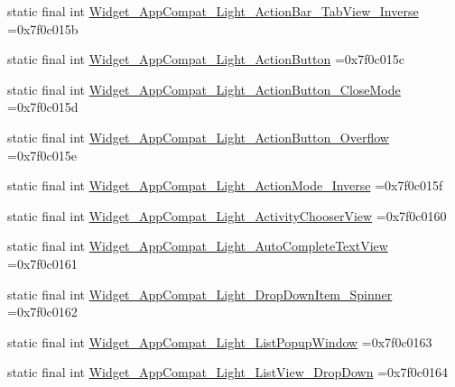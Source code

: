 \begin{DoxyCompactItemize}
\item 
static final int \mbox{\hyperlink{classbr_1_1unb_1_1cic_1_1mp_1_1marketmaster_1_1test_1_1R_1_1style_a48a07100f00fe03eff2b5923bb4497c9}{Widget\+\_\+\+App\+Compat\+\_\+\+Light\+\_\+\+Action\+Bar\+\_\+\+Tab\+View\+\_\+\+Inverse}} =0x7f0c015b
\item 
static final int \mbox{\hyperlink{classbr_1_1unb_1_1cic_1_1mp_1_1marketmaster_1_1test_1_1R_1_1style_a7032dd991bcc4fdb96f36674b180564f}{Widget\+\_\+\+App\+Compat\+\_\+\+Light\+\_\+\+Action\+Button}} =0x7f0c015c
\item 
static final int \mbox{\hyperlink{classbr_1_1unb_1_1cic_1_1mp_1_1marketmaster_1_1test_1_1R_1_1style_a228d59791eb49f6952b786f7f0b281e5}{Widget\+\_\+\+App\+Compat\+\_\+\+Light\+\_\+\+Action\+Button\+\_\+\+Close\+Mode}} =0x7f0c015d
\item 
static final int \mbox{\hyperlink{classbr_1_1unb_1_1cic_1_1mp_1_1marketmaster_1_1test_1_1R_1_1style_a84ecca332097ef3a721f5b960f7c35e5}{Widget\+\_\+\+App\+Compat\+\_\+\+Light\+\_\+\+Action\+Button\+\_\+\+Overflow}} =0x7f0c015e
\item 
static final int \mbox{\hyperlink{classbr_1_1unb_1_1cic_1_1mp_1_1marketmaster_1_1test_1_1R_1_1style_a5d980781c945c7e18c12bfbc52603ca2}{Widget\+\_\+\+App\+Compat\+\_\+\+Light\+\_\+\+Action\+Mode\+\_\+\+Inverse}} =0x7f0c015f
\item 
static final int \mbox{\hyperlink{classbr_1_1unb_1_1cic_1_1mp_1_1marketmaster_1_1test_1_1R_1_1style_a53c3254f94e49db87731526010ddd289}{Widget\+\_\+\+App\+Compat\+\_\+\+Light\+\_\+\+Activity\+Chooser\+View}} =0x7f0c0160
\item 
static final int \mbox{\hyperlink{classbr_1_1unb_1_1cic_1_1mp_1_1marketmaster_1_1test_1_1R_1_1style_ab0f7f0c4a7d37e8284d25ec465812038}{Widget\+\_\+\+App\+Compat\+\_\+\+Light\+\_\+\+Auto\+Complete\+Text\+View}} =0x7f0c0161
\item 
static final int \mbox{\hyperlink{classbr_1_1unb_1_1cic_1_1mp_1_1marketmaster_1_1test_1_1R_1_1style_a17e489d00950784c8a3ad84a2219a38a}{Widget\+\_\+\+App\+Compat\+\_\+\+Light\+\_\+\+Drop\+Down\+Item\+\_\+\+Spinner}} =0x7f0c0162
\item 
static final int \mbox{\hyperlink{classbr_1_1unb_1_1cic_1_1mp_1_1marketmaster_1_1test_1_1R_1_1style_a90360b22602e556a0c4342f0127d85e1}{Widget\+\_\+\+App\+Compat\+\_\+\+Light\+\_\+\+List\+Popup\+Window}} =0x7f0c0163
\item 
static final int \mbox{\hyperlink{classbr_1_1unb_1_1cic_1_1mp_1_1marketmaster_1_1test_1_1R_1_1style_aa3dc53bfc3b3ce20a30c08cd879cf200}{Widget\+\_\+\+App\+Compat\+\_\+\+Light\+\_\+\+List\+View\+\_\+\+Drop\+Down}} =0x7f0c0164

\end{DoxyCompactItemize}
